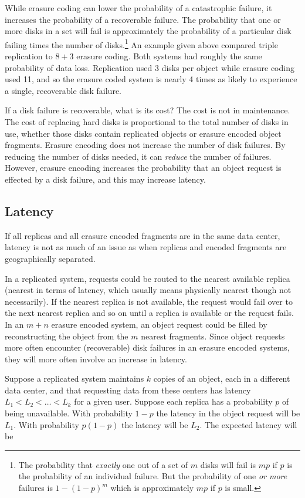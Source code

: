 \documentclass[11pt]{article}
\begin{document}
While erasure coding can lower the probability of a catastrophic failure, it increases the probability of a recoverable failure. The probability that one or more disks in a set will fail is approximately the probability of a particular disk failing times the number of disks.\footnote{The probability that \emph{exactly} one out of a set of $m$ disks will fail is $mp$ if $p$ is the probability of an individual failure. But the probability of one \emph{or more} failures is $1-(1-p)^m$ which is approximately $mp$ if $p$ is small.} An example given above compared triple replication to $8+3$ erasure coding. Both systems had roughly the same probability of data loss. Replication used 3 disks per object while erasure coding used 11, and so the erasure coded system is nearly 4 times as likely to experience a single, recoverable disk failure.

If a disk failure is recoverable, what is its cost? The cost is not in maintenance. The cost of replacing hard disks is proportional to the total number of disks in use, whether those disks contain replicated objects or erasure encoded object fragments. Erasure encoding does not increase the number of disk failures. By reducing the number of disks needed, it can \emph{reduce} the number of failures. However, erasure encoding increases the probability that an object request is effected by a disk failure, and this may increase latency.

\subsection{Latency}

If all replicas and all erasure encoded fragments are in the same data center, latency is not as much of an issue as when replicas and encoded fragments are geographically separated. 

In a replicated system, requests could be routed to the nearest available replica (nearest in terms of latency, which usually means physically nearest though not necessarily). If the nearest replica is not available, the request would fail over to the next nearest replica and so on until a replica is available or the request fails. In an $m+n$ erasure encoded system, an object request could be filled by reconstructing the object from the $m$ nearest fragments. Since object requests more often encounter (recoverable) disk failures in an erasure encoded systems, they will more often involve an increase in latency.

Suppose a replicated system maintains $k$ copies of an object, each in a different data center, and that requesting data from these centers has latency $L_1 < L_2 < \ldots < L_k$ for a given user. Suppose each replica has a probability $p$ of being unavailable. With probability $1-p$ the latency in the object request will be $L_1$. With probability $p(1-p)$ the latency will be $L_2$. The expected latency will be
\end{document}
